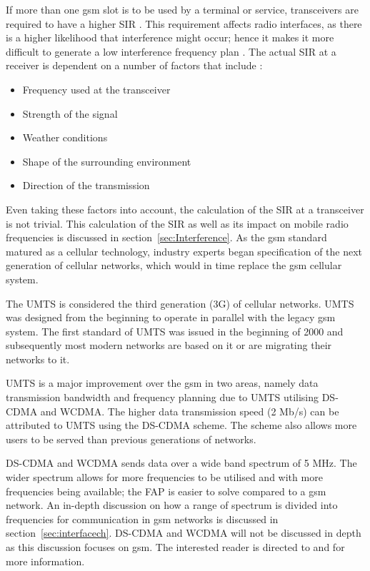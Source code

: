 If more than one \gls{gsm} slot is to be used by a terminal or service, transceivers are required to have a higher \gls{SIR} \cite{GSMArchitectureProtocolsServices,GSMSysEngin}. This requirement affects radio interfaces, as there is a higher likelihood that interference might occur; hence it makes it more difficult to generate a low interference frequency plan \cite{Eisenblatter,GSMSysEngin}. 
The actual \gls{SIR} at a receiver is dependent on a number of factors that include \cite{GSMArchitectureProtocolsServices,Karen2004}:
\begin{itemize}
\item Frequency used at the transceiver
\item Strength of the signal
\item Weather conditions
\item Shape of the surrounding environment
\item Direction of the transmission
\end{itemize}
Even taking these factors into account, the calculation of the \gls{SIR} at a transceiver is not trivial. This calculation of the \gls{SIR} as well as its impact on mobile radio frequencies is discussed in section~\ref{sec:Interference}.
As the \gls{gsm} standard matured as a cellular technology, industry experts began specification of the next generation of cellular networks, which would in time replace the \gls{gsm} cellular system. 

The \gls{UMTS} is considered the third generation (3G) of cellular networks\cite{tabuglobalplanning3g,Eisenblatter}. \gls{UMTS} was designed from the beginning to operate in parallel with the legacy \gls{gsm} system. The first standard of \gls{UMTS} was issued in the beginning of 2000 and subsequently most modern networks are based on it or are migrating their networks to it\cite{tabuglobalplanning3g,Eisenblatter}.

UMTS is a major improvement over the \gls{gsm} in two areas, namely data transmission bandwidth and frequency planning due to \gls{UMTS} utilising \gls{DS-CDMA} and \gls{WCDMA}\cite{tabuglobalplanning3g,Eisenblatter}. The higher data transmission speed (2 Mb/s) can be attributed to \gls{UMTS} using the \gls{DS-CDMA} scheme\cite{tabuglobalplanning3g,Eisenblatter}. The scheme also allows more users to be served than previous generations of networks\cite{tabuglobalplanning3g,Eisenblatter}. 

DS-CDMA and \gls{WCDMA} sends data over a wide band spectrum of 5 MHz. The wider spectrum allows for more frequencies to be utilised and with more frequencies being available; the \gls{FAP} is easier to solve compared to a \gls{gsm} network\cite{tabuglobalplanning3g,Eisenblatter}\@. An in-depth discussion on how a range of spectrum is divided into frequencies for communication in \gls{gsm} networks is discussed in section~\ref{sec:interfacech}. \gls{DS-CDMA} and \gls{WCDMA} will not be discussed in depth as this discussion focuses on \gls{gsm}\@. The interested reader is directed to \cite{tabuglobalplanning3g} and \cite{wirelesstelcoMullet} for more information.

